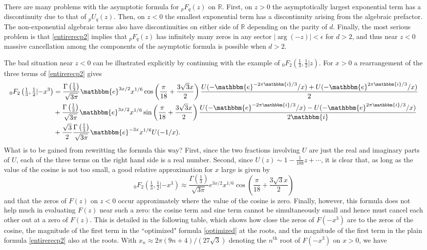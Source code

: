 \documentclass[12pt]{article}
\newcommand{\ee}[0] {\mathbbm{e}}
\newcommand{\ii}[0] {\mathbbm{i}}
\numberwithin{equation}{section}
\newcommand{\FFf}[5] {{}_{#1}{#2}_{#3} \left(#4 | {#5} \right)}
\begin{document}
There are many problems with the asymptotic formula for ${}_p F_{q}(z)$ on $\mathbb{R}$. First, on $z>0$ the asymptotically largest exponential term has a discontinuity due to that of ${}_p U_{q}(z)$. Then, on $z<0$ the smallest exponential term has a discontinuity arising from the algebraic prefactor. The non-exponential algebraic terms also have discontinuities on either side of $\mathbb{R}$ depending on the parity of $d$. Finally, the most serious problem is that \eqref{entirerecp2} implies that ${}_p F_{q}(z)$ has infinitely many zeros in any sector $|\arg(-z)| < \epsilon$ for $d>2$, and thus near $z<0$ massive cancellation among the components of the asymptotic formula is possible when $d>2$.

The bad situation near $z<0$ can be illustrated explicitly by continuing with the example of $\FFf{0}{F}{2}{\tfrac{1}{3},\tfrac{1}{2}}{z}$. For $x>0$ a rearrangement of the three terms of \eqref{entirerecp2} gives
\begin{equation}
\label{optimized}
\begin{aligned}
\FFf{0}{F}{2}{\tfrac{1}{3},\tfrac{1}{2}}{-x^3} &= \frac{\Gamma\left(\frac{1}{3}\right)}{\sqrt{3 \pi }} \ee^{3 x/2} x^{1/6} \cos \left(\frac{\pi}{18} + \frac{3 \sqrt{3}
   x}{2}\right)\frac{U(-\ee^{-2 \pi \ii/3}/x)+U(-\ee^{2 \pi \ii/3}/x)}{2}\\
&+\frac{\Gamma\left(\frac{1}{3}\right)}{\sqrt{3 \pi }} \ee^{3 x/2} x^{1/6} \sin \left(\frac{\pi }{18} + \frac{3 \sqrt{3}
   x}{2}\right)
   \frac{U(-\ee^{-2\pi \ii/3}/x)-U(-\ee^{2\pi \ii/3}/x)}{2\ii}\\
 &+\frac{\sqrt{3}}{2} \frac{\Gamma\left(\frac{1}{3}\right)}{\sqrt{3 \pi }} \ee^{-3x} x^{1/6} U(-1/x)
\text{.}
\end{aligned}
\end{equation}
What is to be gained from rewritting the formula this way? First, since the two fractions involving $U$ are just the real and imaginary parts of $U$, each of the three terms on the right hand side is a real number. Second, since $U(z) \sim 1-\frac{1}{108}z + \cdots$, it is clear that, as long as the value of the cosine is not too small, a good relative approximation for $x$ large is given by
\begin{equation*}
\FFf{0}{F}{2}{\tfrac{1}{3},\tfrac{1}{2}}{-x^3} \approx \frac{\Gamma\left(\frac{1}{3}\right)}{\sqrt{3 \pi }} e^{3 x/2} x^{1/6}
   \cos \left(\frac{\pi }{18} + \frac{3 \sqrt{3}
   x}{2}\right)
\end{equation*}
and that the zeros of $F(z)$ on $z<0$ occur approximately where the value of the cosine is zero. Finally, however, this formula does not help much in evaluating $F(z)$ near such a zero: the cosine term and sine term cannot be simultaneously small and hence must cancel each other out at a zero of $F(z)$. This is detailed in the following table, which shows how close the zeros of $F(-x^3)$ are to the zeros of the cosine, the magnitude of the first term in the ``optimized" formula \eqref{optimized} at the roots, and the magnitude of the first term in the plain formula \eqref{entirerecp2} also at the roots. With $x_n \approx 2\pi(9n+4)/(27 \sqrt{3})$ denoting the $n^{\text{th}}$ root of $F(-x^3)$ on $x>0$, we have
\end{document}
